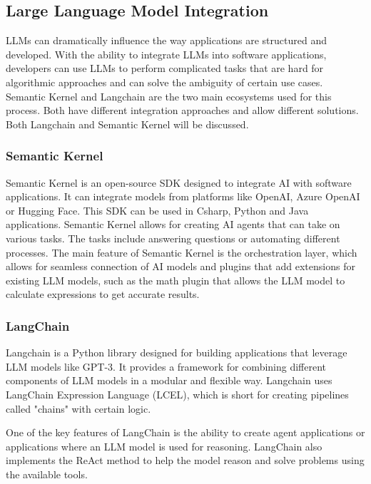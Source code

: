 \subsection{Large Language Model Integration}

LLMs can dramatically influence the way applications are structured and developed. With the ability to integrate LLMs into software applications, developers can use LLMs to perform complicated tasks that are hard for algorithmic approaches and can solve the ambiguity of certain use cases. Semantic Kernel \cite{semantickernel} and Langchain \cite{langchain_2023} are the two main ecosystems used for this process. Both have different integration approaches and allow different solutions. Both Langchain and Semantic Kernel will be discussed. 

\subsubsection{Semantic Kernel}

Semantic Kernel \cite{semantickernel} is an open-source SDK designed to integrate AI with software applications. It can integrate models from platforms like OpenAI, Azure OpenAI or Hugging Face. This SDK can be used in Csharp, Python and Java applications. Semantic Kernel allows for creating AI agents that can take on various tasks. The tasks include answering questions or automating different processes. The main feature of Semantic Kernel is the orchestration layer, which allows for seamless connection of AI models and plugins that add extensions for existing LLM models, such as the math plugin that allows the LLM model to calculate expressions to get accurate results. 

\subsubsection{LangChain}

Langchain \cite{langchain_2023} is a Python library designed for building applications that leverage LLM models like GPT-3. It provides a framework for combining different components of LLM models in a modular and flexible way. Langchain uses LangChain Expression Language (LCEL), which is short for creating pipelines called "chains" with certain logic. 

One of the key features of LangChain is the ability to create agent applications or applications where an LLM model is used for reasoning. LangChain also implements the ReAct \cite{yao2023react} method to help the model reason and solve problems using the available tools. 

